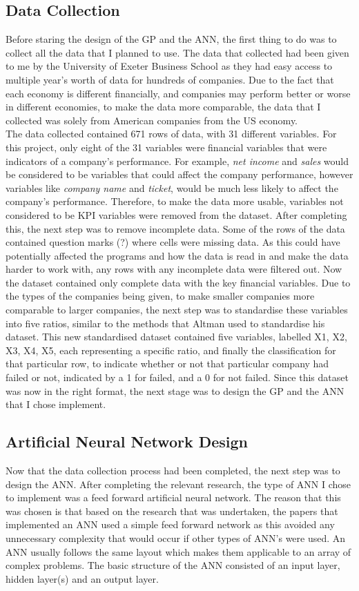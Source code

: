 \documentclass[11pt]{article}
\begin{document}
\subsection{Data Collection}
Before staring the design of the GP and the ANN, the first thing to do was to collect all the data that I planned to use. The data that collected had been given to me by the University of Exeter Business School as they had easy access to multiple year's worth of data for hundreds of companies. Due to the fact that each economy is different financially, and companies may perform better or worse in different economies, to make the data more comparable, the data that I collected was solely from American companies from the US economy.\\
The data collected contained 671 rows of data, with 31 different variables. For this project, only eight of the 31 variables were financial variables that were indicators of a company's performance. For example, \textit{net income} and \textit{sales} would be considered to be variables that could affect the company performance, however variables like \textit{company name} and \textit{ticket}, would be much less likely to affect the company's performance. Therefore, to make the data more usable, variables not considered to be KPI variables were removed from the dataset. After completing this, the next step was to remove incomplete data. Some of the rows of the data contained question marks (?) where cells were missing data. As this could have potentially affected the programs and how the data is read in and make the data harder to work with, any rows with any incomplete data were filtered out. Now the dataset contained only complete data with the key financial variables. Due to the types of the companies being given, to make smaller companies more comparable to larger companies, the next step was to standardise these variables into five ratios, similar to the methods that Altman used to standardise his dataset. This new standardised dataset contained five variables, labelled X1, X2, X3, X4, X5, each representing a specific ratio, and finally the classification for that particular row, to indicate whether or not that particular company had failed or not, indicated by a 1 for failed, and a 0 for not failed. Since this dataset was now in the right format, the next stage was to design the GP and the ANN that I chose implement. 

\subsection{Artificial Neural Network Design}
Now that the data collection process had been completed, the next step was to design the ANN. After completing the relevant research, the type of ANN I chose to implement was a feed forward artificial neural network. The reason that this was chosen is that based on the research that was undertaken, the papers that implemented an ANN used a simple feed forward network as this avoided any unnecessary complexity that would occur if other types of ANN's were used. An ANN usually follows the same layout which makes them applicable to an array of complex problems. The basic structure of the ANN consisted of an input layer, hidden layer(s) and an output layer.
\end{document}
